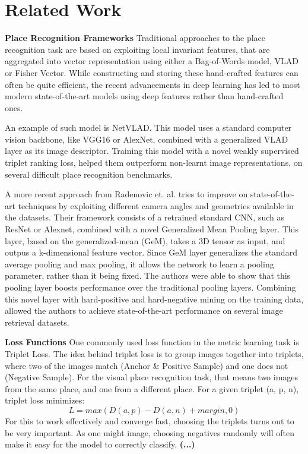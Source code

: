 \documentclass[conference]{IEEEtran}
\begin{document}

\section{Related Work}
\textbf{Place Recognition Frameworks} 
Traditional approaches to the place recognition task are based on exploiting local invariant features, that are aggregated into vector representation using either
a Bag-of-Words model, VLAD or Fisher Vector. While constructing and storing these hand-crafted features can often be quite efficient, the recent advancements in 
deep learning has led to most modern state-of-the-art models using deep features rather than hand-crafted ones. 

An example of such model is NetVLAD. This model uses a standard computer vision backbone, like VGG16 or AlexNet, combined with a generalized 
VLAD layer as its image descriptor. Training this model with a novel weakly supervised triplet ranking loss, helped them outperform non-learnt image representations,
on several difficult place recognition benchmarks. 

A more recent approach from Radenovic et. al. tries to improve on state-of-the-art techniques by exploiting different camera angles and geometries available 
in the datasets. Their framework consists of a retrained standard CNN, such as ResNet or Alexnet, combined with a novel Generalized Mean Pooling layer. 
This layer, based on the generalized-mean (GeM), takes a 3D tensor as input, and outpus a k-dimensional feature vector. Since GeM layer generalizes the standard 
average pooling and max pooling, it allows the network to learn a pooling parameter, rather than it being fixed. The authors were able to show that this 
pooling layer boosts performance over the traditional pooling layers. Combining this novel layer with hard-positive and hard-negative mining on the training data, 
allowed the authors to achieve state-of-the-art performance on several image retrieval datasets. 

\textbf{Loss Functions} 
One commonly used loss function in the metric learning task is Triplet Loss. The idea behind triplet loss is to group images together into triplets, where two of the 
images match (Anchor \& Positive Sample) and one does not (Negative Sample). For the visual place recognition task, that means two images from the same place, and 
one from a different place. For a given triplet (a, p, n), triplet loss minimizes: 
\begin{equation}
    L = max(D(a,p) - D(a,n) + margin, 0)
\end{equation}
For this to work effectively and converge fast, choosing the triplets turns out to be very important. As one might image, choosing negatives randomly will often 
make it easy for the model to correctly classify. \textbf{(...)} 
\end{document}
